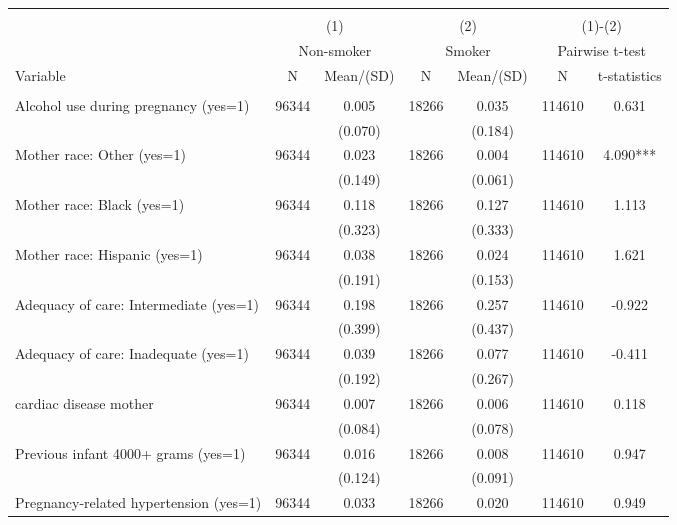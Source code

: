 \begin{tabular}{@{\extracolsep{5pt}}lcccccc}
\\[-1.8ex]\hline \hline \\[-1.8ex]
 & \multicolumn{2}{c}{(1)}  & \multicolumn{2}{c}{(2)}  & \multicolumn{2}{c}{(1)-(2)} \\
 & \multicolumn{2}{c}{Non-smoker}  & \multicolumn{2}{c}{Smoker}  & \multicolumn{2}{c}{Pairwise t-test}  \\
Variable & N & Mean/(SD) & N & Mean/(SD) & N & t-statistics \\ \hline \\[-1.8ex] 
Alcohol use during pregnancy (yes=1)   & 96344    & 0.005    & 18266    & 0.035    & 114610    & 0.631   \\
 &   & (0.070)  &   & (0.184)  &   &  \\ [1ex]
Mother race: Other (yes=1)   & 96344    & 0.023    & 18266    & 0.004    & 114610    & 4.090***   \\
 &   & (0.149)  &   & (0.061)  &   &  \\ [1ex]
Mother race: Black (yes=1)   & 96344    & 0.118    & 18266    & 0.127    & 114610    & 1.113   \\
 &   & (0.323)  &   & (0.333)  &   &  \\ [1ex]
Mother race: Hispanic (yes=1)   & 96344    & 0.038    & 18266    & 0.024    & 114610    & 1.621   \\
 &   & (0.191)  &   & (0.153)  &   &  \\ [1ex]
Adequacy of care: Intermediate (yes=1)   & 96344    & 0.198    & 18266    & 0.257    & 114610    & -0.922   \\
 &   & (0.399)  &   & (0.437)  &   &  \\ [1ex]
Adequacy of care: Inadequate (yes=1)   & 96344    & 0.039    & 18266    & 0.077    & 114610    & -0.411   \\
 &   & (0.192)  &   & (0.267)  &   &  \\ [1ex]
cardiac disease mother   & 96344    & 0.007    & 18266    & 0.006    & 114610    & 0.118   \\
 &   & (0.084)  &   & (0.078)  &   &  \\ [1ex]
Previous infant 4000+ grams (yes=1)   & 96344    & 0.016    & 18266    & 0.008    & 114610    & 0.947   \\
 &   & (0.124)  &   & (0.091)  &   &  \\ [1ex]
Pregnancy-related hypertension (yes=1)   & 96344    & 0.033    & 18266    & 0.020    & 114610    & 0.949   \\

\end{tabular}
